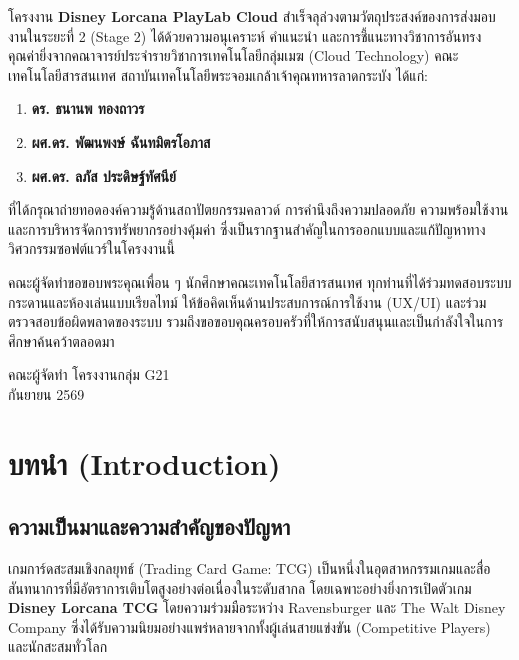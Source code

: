 \documentclass[12pt,a4paper]{report}
\begin{document}
โครงงาน \textbf{Disney Lorcana PlayLab Cloud} สำเร็จลุล่วงตามวัตถุประสงค์ของการส่งมอบงานในระยะที่ 2 (Stage 2) ได้ด้วยความอนุเคราะห์ คำแนะนำ และการชี้แนะทางวิชาการอันทรงคุณค่ายิ่งจากคณาจารย์ประจำรายวิชาการเทคโนโลยีกลุ่มเมฆ (Cloud Technology) คณะเทคโนโลยีสารสนเทศ สถาบันเทคโนโลยีพระจอมเกล้าเจ้าคุณทหารลาดกระบัง ได้แก่:
\begin{enumerate}[leftmargin=1.5cm]
    \item \textbf{ดร. ธนานพ ทองถาวร}
    \item \textbf{ผศ.ดร. พัฒนพงษ์ ฉันทมิตรโอภาส}
    \item \textbf{ผศ.ดร. ลภัส ประดิษฐ์ทัศนีย์}
\end{enumerate}
ที่ได้กรุณาถ่ายทอดองค์ความรู้ด้านสถาปัตยกรรมคลาวด์ การคำนึงถึงความปลอดภัย ความพร้อมใช้งาน และการบริหารจัดการทรัพยากรอย่างคุ้มค่า ซึ่งเป็นรากฐานสำคัญในการออกแบบและแก้ปัญหาทางวิศวกรรมซอฟต์แวร์ในโครงงานนี้

คณะผู้จัดทำขอขอบพระคุณเพื่อน ๆ นักศึกษาคณะเทคโนโลยีสารสนเทศ ทุกท่านที่ได้ร่วมทดสอบระบบกระดานและห้องเล่นแบบเรียลไทม์ ให้ข้อคิดเห็นด้านประสบการณ์การใช้งาน (UX/UI) และร่วมตรวจสอบข้อผิดพลาดของระบบ รวมถึงขอขอบคุณครอบครัวที่ให้การสนับสนุนและเป็นกำลังใจในการศึกษาค้นคว้าตลอดมา

\vspace{1.5cm}
\begin{flushright}
    คณะผู้จัดทำ โครงงานกลุ่ม G21\\
    กันยายน 2569
\end{flushright}

\newpage

\tableofcontents
\newpage
\listoftables
\newpage
\listoffigures
\newpage

\setcounter{page}{1}

\chapter{บทนำ (Introduction)}

\section{ความเป็นมาและความสำคัญของปัญหา}
เกมการ์ดสะสมเชิงกลยุทธ์ (Trading Card Game: TCG) เป็นหนึ่งในอุตสาหกรรมเกมและสื่อสันทนาการที่มีอัตราการเติบโตสูงอย่างต่อเนื่องในระดับสากล โดยเฉพาะอย่างยิ่งการเปิดตัวเกม \textbf{Disney Lorcana TCG} โดยความร่วมมือระหว่าง Ravensburger และ The Walt Disney Company ซึ่งได้รับความนิยมอย่างแพร่หลายจากทั้งผู้เล่นสายแข่งขัน (Competitive Players) และนักสะสมทั่วโลก
\end{document}
